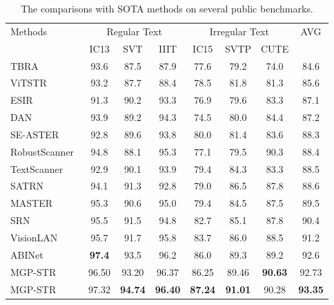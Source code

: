 \documentclass[runningheads]{llncs}
\newcommand{\ra}[1]{\renewcommand{\arraystretch}{#1}}
\begin{document}
\begin{table*}[t]
\setlength{\tabcolsep}{5pt}
\ra{1}
\centering
\caption{The comparisons with SOTA methods on several public benchmarks.}
\label{tab:sota}
\begin{tabular}{|l|c|c|c|c|c|c|c|}
\hline
\multirow{2}{*}{Methods}   &\multicolumn{3}{c|}{Regular Text} &\multicolumn{3}{c|}{Irregular Text} &\multirow{2}{*}{AVG}\\
\cline{2-7}
&IC13 &SVT  &IIIT   & IC15 & SVTP &CUTE &  \\
\hline
TBRA~\cite{deep}   &93.6 &87.5 &87.9 &77.6 &79.2  & 74.0  & 84.6 \\
ViTSTR~\cite{ViTSTR} &93.2 & 87.7 & 88.4 &78.5 &81.8 &81.3 &85.6 \\
ESIR~\cite{ESIR}   &91.3  &90.2 &93.3 &76.9 &79.6 &83.3  &  87.1  \\
DAN~\cite{DAN} &93.9  &89.2 &94.3  &74.5  &80.0 &84.4   &  87.2  \\
SE-ASTER~\cite{SEED}   &92.8 &89.6 &93.8 &80.0 &81.4 &83.6  & 88.3  \\
RobustScanner~\cite{RobustScanner}     & 94.8 & 88.1  & 95.3 & 77.1 & 79.5 &  90.3 & 88.4 \\
TextScanner~\cite{TextScanner} &92.9 &90.1 &93.9 &79.4 &84.3 &83.3  & 88.5 \\
SATRN~\cite{SATRN}    &94.1 &91.3 &92.8  &79.0 &86.5 &87.8 &  88.6 \\
MASTER~\cite{MASTER} &95.3	&90.6	&95.0	&79.4	&84.5	&87.5 & 89.5 \\
\hline
SRN~\cite{SRN}     & 95.5 & 91.5  & 94.8  &82.7  &85.1   &87.8 & 90.4 \\
VisionLAN~\cite{vlan} &95.7 &91.7& 95.8 &83.7 &86.0 &88.5 &91.2 \\
ABINet~\cite{ABInet}    &\textbf{97.4} &{93.5} &{96.2} &{86.0} &{89.3} &89.2  & {92.6} \\
\hline
MGP-STR  &96.50 &93.20 &{96.37} &86.25 &89.46 &\textbf{90.63} &92.73 \\
MGP-STR  &{97.32}	&\textbf{94.74}	&\textbf{96.40}	&\textbf{87.24}	&\textbf{91.01}	&{90.28}	&\textbf{93.35} \\
\hline
\end{tabular}
\end{table*}
\end{document}
